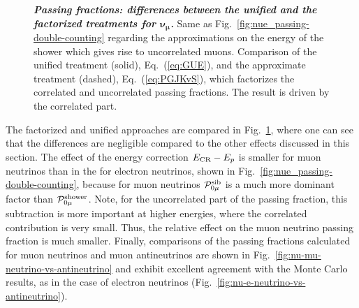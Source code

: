 \begin{figure}
	\centering
	\caption{\textbf{\textit{Passing fractions: differences between the unified and the factorized treatments for $\boldsymbol{\nu_\mu}$.}} Same as Fig.~\ref{fig:nue_passing-double-counting} regarding the approximations on the energy of the shower which gives rise to uncorrelated muons. Comparison of the unified treatment (solid), Eq.~(\ref{eq:GUE}), and the approximate treatment (dashed), Eq.~(\ref{eq:PGJKvS}), which factorizes the correlated and uncorrelated passing fractions. The result is driven by the correlated part.}
	\label{fig:nu-mu-unified-effect}
\end{figure}

The factorized and unified approaches are compared in Fig.~\ref{fig:nu-mu-unified-effect}, where one can see that the differences are negligible compared to the other effects discussed in this section.
The effect of the energy correction $E_{\rm CR}-E_p$ is smaller for muon neutrinos than in the for electron neutrinos, shown in Fig.~\ref{fig:nue_passing-double-counting}, because for muon neutrinos ${\mathcal P}_{0\mu}^{\rm sib}$ is a much more dominant factor than ${\mathcal P}_{0\mu}^{\rm shower}$.
Note, for the uncorrelated part of the passing fraction, this subtraction is more important at higher energies, where the correlated contribution is very small.
Thus, the relative effect on the muon neutrino passing fraction is much smaller.
Finally, comparisons of the passing fractions calculated for muon neutrinos and muon antineutrinos are shown in Fig.~\ref{fig:nu-mu-neutrino-vs-antineutrino} and exhibit excellent agreement with the Monte Carlo results, as in the case of electron neutrinos (Fig.~\ref{fig:nu-e-neutrino-vs-antineutrino}).

